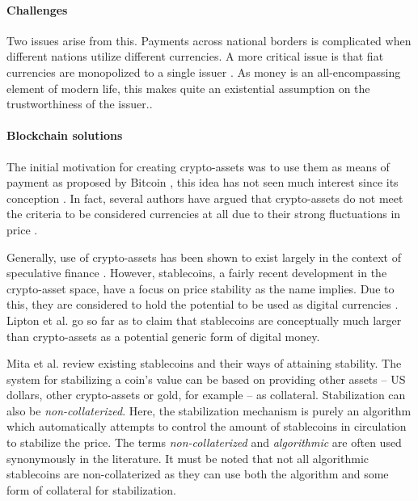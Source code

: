 \paragraph{Challenges} Two  issues arise from this. Payments
across national borders is complicated when different nations utilize
different currencies. A more critical issue is that fiat currencies
are monopolized to a single issuer \cite{eichengreenCommodity}. As
money is an all-encompassing element of modern life, this makes quite
an existential assumption on the trustworthiness of the issuer.. 

\paragraph{Blockchain solutions} The initial motivation for
creating crypto-assets was to use them as means of payment as proposed
by Bitcoin \cite{nakamoto2008bitcoin}, this idea has not seen much
interest since its conception \cite{liptonTether}. In fact, several
authors have argued that crypto-assets do not meet the criteria to be
considered currencies at all due to their strong fluctuations in price
\cite{carstensMoney,merschVirtual,yermackBitcoin}. 

Generally, use of crypto-assets has been shown to exist largely in the
context of speculative finance \cite{liptonTether,steinmetzOwnership}.
However, stablecoins, a fairly recent development in the
crypto-asset space, have a focus on price stability
\cite{mitaStablecoin} as the name implies. Due to this, they are
considered to hold the potential to be used as digital currencies
\cite{bullmannSearch,liptonTether}. Lipton et al. go so far as to
claim that stablecoins are conceptually much larger than crypto-assets
as a potential generic form of digital money.

Mita et al. \cite{mitaStablecoin} review existing stablecoins and
their ways of attaining stability. The system for stabilizing a coin's
value can be based on providing other assets -- US dollars, other
crypto-assets or gold, for example -- as collateral. Stabilization
can also be \textit{non-collaterized}. Here, the stabilization
mechanism is purely an algorithm which automatically attempts to
control the amount of stablecoins in circulation to stabilize the
price. The terms \textit{non-collaterized} and \textit{algorithmic}
are often used synonymously in the literature. It must be noted that
not all algorithmic stablecoins are non-collaterized as they can use
both the algorithm and some form of collateral for stabilization.

